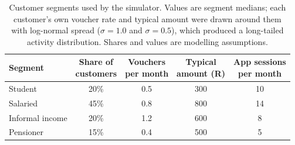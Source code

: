 \begin{table}[htbp]
\centering
\small
\caption{Customer segments used by the simulator. Values are segment medians; each customer's own voucher rate and typical amount were drawn around them with log-normal spread ($\sigma = 1.0$ and $\sigma = 0.5$), which produced a long-tailed activity distribution. Shares and values are modelling assumptions.}
\label{tab:segments}
\begin{tabular}{lcccc}
\toprule
Segment & \makecell{Share of\\customers} & \makecell{Vouchers\\per month} & \makecell{Typical\\amount (R)} & \makecell{App sessions\\per month} \\
\midrule
Student          & 20\% & 0.5 & 300 & 10 \\
Salaried         & 45\% & 0.8 & 800 & 14 \\
Informal income  & 20\% & 1.2 & 600 & 8 \\
Pensioner        & 15\% & 0.4 & 500 & 5 \\
\bottomrule
\end{tabular}
\end{table}
